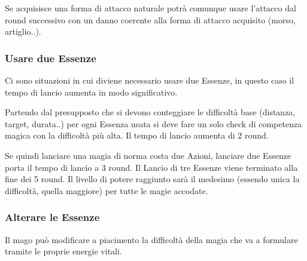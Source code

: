 \documentclass[a4paper,11pt,twoside,openany]{book}
\begin{document}
Se acquisisce una forma di attacco naturale potrà comunque usare l'attacco dal round successivo con un danno coerente alla forma di attacco acquisito (morso, artiglio..).

\subsubsection{Usare due Essenze}

Ci sono situazioni in cui diviene necessario usare due Essenze, in questo caso il tempo di lancio aumenta in modo significativo.

Partendo dal presupposto che si devono conteggiare le difficoltà base (distanza, target, durata..) per ogni Essenza usata si deve fare un solo check di competenza magica con la difficoltà più alta. Il tempo di lancio aumenta di 2 round.

Se quindi lanciare una magia di norma costa due Azioni, lanciare due Essenze porta il tempo di lancio a 3 round. Il Lancio di tre Essenze viene terminato alla fine dei 5 round. Il livello di potere raggiunto sarà il medesimo (essendo unica la difficoltà, quella maggiore) per tutte le magie accodate.

\subsubsection{Alterare le Essenze}

\label{alterare-le-essenze}

Il mago può modificare a piacimento la difficoltà della magia che va a formulare tramite le proprie energie vitali.
\end{document}
